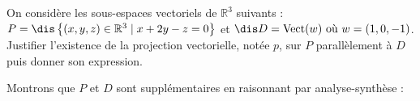 \documentclass[a4paper,10pt]{report}
\begin{document}
\begin{ex} On considère les sous-espaces vectoriels de $\mathbb{R}^3 $ suivants : $P = \dis \left\{ {(x,y,z) \in \mathbb{R}^3 \mid x + 2y - z = 0} \right\}$ et $\dis D = \textrm{Vect} (w){\text{ o\`u }}w = (1,0, - 1)$. Justifier l'existence de la projection vectorielle, notée $p$, sur $P$ parallèlement à $D$ puis donner son expression.

\medskip

%

\noindent Montrons que $P$ et $D$ sont supplémentaires en raisonnant par analyse-synthèse :

%
%
%
%

\vspace{12cm}
\newpage
\phantom{test}

\vspace{8cm}
\end{ex}
\end{document}
